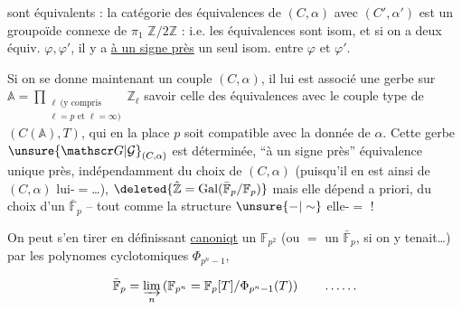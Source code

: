 

sont équivalents : la catégorie des équivalences
de $(C,\alpha)$ avec $(C',\alpha')$ est un groupoïde connexe de
$\pi_1$ $\mathbb Z/2\mathbb Z$ : i.e.  les équivalences sont
isom, et si on a deux équiv. $\varphi,\varphi'$, il y a \uline{à un
signe près} un seul isom. entre $\varphi$ et $\varphi'$.

Si on se donne maintenant un couple $(C,\alpha)$,
il lui est associé une  gerbe sur $\mathbb A=\prod_{\substack{\ell\ (\text{y compris}\\\ell=p\text{ et }\ell=\infty)}}\mathbb Z_\ell$
 savoir celle des équivalences  avec le  couple
type de $(C(\mathbb A),T)$, qui en la place $p$ soit
compatible avec la donnée de $\alpha$. Cette gerbe
$\unsure{\mathscr G|\mathcal G}_{(C,\alpha)}$ est déterminée, ``à un signe près''  équivalence
unique près, indépendamment du choix de $(C,\alpha)$
(puisqu'il en est ainsi de $(C,\alpha)$ lui-$=$\ldots), 
$\deleted{\hat{\mathbb Z}=\mathrm{Gal}(\bar{\mathbb F}_p/\mathbb F_p)}$  mais elle dépend
a priori,  du choix d'un $\bar{\mathbb F}_p$  -- tout comme la structure $\unsure{-|\sim}$ elle-$=$ !


On peut s'en tirer en définissant \uline{canoniqt} un
$\mathbb F_{p^2}$ (ou $=$ un $\bar{\mathbb F}_p$, si on y tenait\ldots) par les polynomes
cyclotomiques $\Phi_{p^n-1}$,

\[
\bar{\mathbb F}_p=\varinjlim_n\left(\mathbb F_{p^n}=\mathbb F_p[T]/\Phi_{p^n-1}(T)\right)
\qquad \ldots\ldots
\]
\unsure{;}
